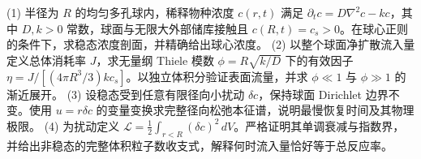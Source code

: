 (1) 半径为 \(R\) 的均匀多孔球内，稀释物种浓度 \(c(r,t)\) 满足 \( \partial_t c=D\nabla^2c-kc\)，其中 \(D,k>0\) 常数，球面与无限大外部储库接触且 \(c(R,t)=c_s>0\)。在球心正则的条件下，求稳态浓度剖面，并精确给出球心浓度。
(2) 以整个球面净扩散流入量定义总体消耗率 \(J\)，求无量纲 Thiele 模数 \(\phi=R\sqrt{k/D}\) 下的有效因子 \(\eta=J/[(4\pi R^3/3)kc_s]\)。以独立体积分验证表面流量，并求 \(\phi\ll1\) 与 \(\phi\gg1\) 的渐近展开。
(3) 设稳态受到任意有限径向小扰动 \(\delta c\)，保持球面 Dirichlet 边界不变。使用 \(u=r\delta c\) 的变量变换求完整径向松弛本征谱，说明最慢恢复时间及其物理极限。
(4) 为扰动定义 \( \mathcal L=\frac12\int_{r<R}(\delta c)^2\,dV\)。严格证明其单调衰减与指数界，并给出非稳态的完整体积粒子数收支式，解释何时流入量恰好等于总反应率。